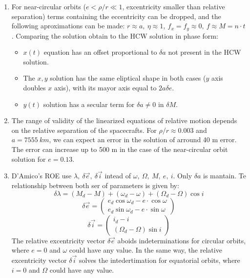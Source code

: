 \documentclass[a4paper]{article}
\begin{document}
\begin{enumerate}[label=\emph{\alph*)}]
  \item %
    For near-circular orbits ($e<\rho/r\ll1$, excentricity smaller than relative separation) terms containing the eccentricity can be dropped, and the following aproximations can be made: $r\approx a, ~\eta \approx 1,~f_x = f_y \approx 0,~f\approx M=n\cdot t$. Comparing the solution obtain to the HCW solution in phase form:
    \begin{itemize}
      \item $x(t)$ equation has an offset proportional to $\delta a$ not present in the HCW solution.
      \item The $x,y$ solution has the same eliptical shape in both cases ($y$ axis doubles $x$ axis), with its mayor axis equal to $2a\delta e$.
      \item $y(t)$ solution has a secular term for $\delta a \neq 0$ in $\delta M$.
    \end{itemize}

  \item %
    The range of validity of the linearized equations of relative motion depends on the relative separation of the spacecrafts. For $\rho/r\approx 0.003$ and $a=7555~km$, we can expect an error in the solution of arround 40 m error. The error can increase up to 500 m in the case of the near-circular orbit solution for $e=0.13$.

  \item %
    D'Amico's ROE use $\lambda,~\delta \vec{e},~\delta \vec{i}$ intead of $\omega,~\Omega,~M,~e,~i$. Only $\delta a$ is mantain. Te relationship between both ser of parameters is given by:
    \[\delta\lambda=(M_d-M)+(\omega_d-\omega)+(\Omega_d-\Omega)\cos{i} \]
    \[\delta\vec{e} = \left( \begin{array}{cc} e_d\cos{\omega_d}-e\cdot\cos{\omega} \\
      e_d\sin{\omega_d}-e\cdot\sin{\omega} \end{array} \right) \]
    \[\delta\vec{i} = \left( \begin{array}{cc} i_d-i \\ (\Omega_d-\Omega)\sin{i} \end{array} \right) \]
    The relative excentricity vector $\delta\vec{e}$ aboids indeterminations for circular orbits, where $e=0$ and $\omega$ could have any value. In the same way, the relative excentricity vector $\delta\vec{i}$ solves the intedertimation for equatorial orbits, where $i=0$ and $\Omega$ could have any value.


\end{enumerate}
\end{document}

